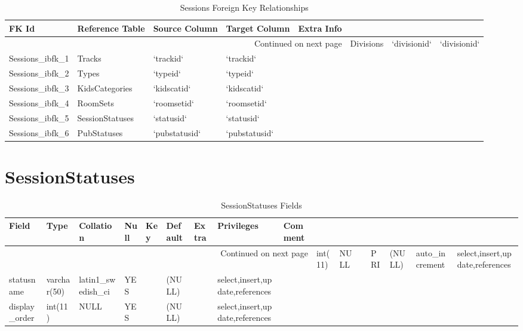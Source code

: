 \documentclass[tablesignature,landscape]{scrartcl}
\begin{document}
\begin{longtable}{|l|l|l|l|l|}
\caption{Sessions Foreign Key Relationships} \label{tbl:sessionsfkr}\\
\hline
 FK Id                  &  Reference Table  &  Source Column  &  Target Column  &  Extra Info \\
\hline
\endhead
\hline\multicolumn{5}{r}{Continued on next page}\
\endfoot
\endlastfoot
\hline
 Sessions\_{}ibfk\_{}7  &  Divisions        &  `divisionid`   &  `divisionid`   &              \\
 Sessions\_{}ibfk\_{}1  &  Tracks           &  `trackid`      &  `trackid`      &              \\
 Sessions\_{}ibfk\_{}2  &  Types            &  `typeid`       &  `typeid`       &              \\
 Sessions\_{}ibfk\_{}3  &  KidsCategories   &  `kidscatid`    &  `kidscatid`    &              \\
 Sessions\_{}ibfk\_{}4  &  RoomSets         &  `roomsetid`    &  `roomsetid`    &              \\
 Sessions\_{}ibfk\_{}5  &  SessionStatuses  &  `statusid`     &  `statusid`     &              \\
 Sessions\_{}ibfk\_{}6  &  PubStatuses      &  `pubstatusid`  &  `pubstatusid`  &              \\
\hline
\end{longtable}
\section{SessionStatuses}
\label{sec-30}


\begin{longtable}{|l|l|l|l|l|l|l|l|l|}
\caption{SessionStatuses Fields} \label{tbl:sessionstatusesfields}\\
\hline
 Field             &  Type         &  Collation                &  Null  &  Key  &  Default  &  Extra              &  Privileges                       &  Comment \\
\hline
\endhead
\hline\multicolumn{9}{r}{Continued on next page}\
\endfoot
\endlastfoot
\hline
 statusid          &  int(11)      &  NULL                     &        &  PRI  &  (NULL)   &  auto\_{}increment  &  select,insert,update,references  &           \\
 statusname        &  varchar(50)  &  latin1\_{}swedish\_{}ci  &  YES   &       &  (NULL)   &                     &  select,insert,update,references  &           \\
 display\_{}order  &  int(11)      &  NULL                     &  YES   &       &  (NULL)   &                     &  select,insert,update,references  &           \\
\hline
\end{longtable}
\end{document}
